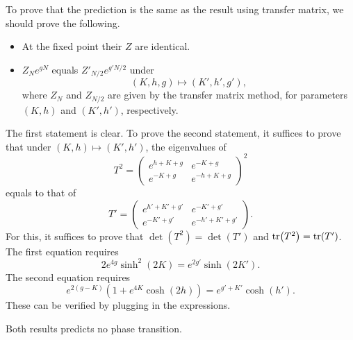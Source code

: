 \documentclass{article}
\begin{document}
To prove that the prediction is the same as the result using transfer matrix, we should prove the following.
\begin{itemize}
    \item At the fixed point their $Z$ are identical.
    \item $Z_N e^{g N}$ equals $Z'_{N/2} e^{g' N/2}$ under 
    \[ (K,h,g) \mapsto (K',h',g'), \]
    where $Z_N$ and $Z_{N/2}$ are given by the transfer matrix method, for parameters $(K,h)$ and $(K',h')$, respectively.
\end{itemize}
The first statement is clear.
To prove the second statement, it suffices to prove that under $(K,h) \mapsto (K',h')$, the eigenvalues of
\[ T^2 = \begin{pmatrix}
    e^{h+K+g} & e^{-K+g} \\
    e^{-K+g} & e^{-h+K+g}
\end{pmatrix}^2 \]
equals to that of
\[ T' = \begin{pmatrix}
    e^{h'+K'+g'} & e^{-K'+g'} \\
    e^{-K'+g'} & e^{-h'+K'+g'}
\end{pmatrix}. \]
For this, it suffices to prove that $\det(T^2) = \det(T')$ and $\tr(T^2) = \tr(T')$.
The first equation requires
\[ 2 e^{4g} \sinh^2(2K) = e^{2g'} \sinh(2K'). \]
The second equation requires
\[ e^{2(g - K)}(1+e^{4K} \cosh(2h)) = e^{g'+K'}\cosh(h'). \]
These can be verified by plugging in the expressions.
\par
Both results predicts no phase transition.
\end{document}
